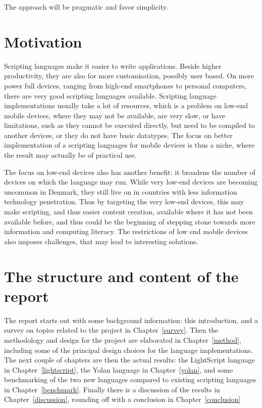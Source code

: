 \documentclass[11pt]{report}
\begin{document}
    The approach will be pragmatic and favor simplicity.

\section{Motivation}

Scripting languages make it easier to write applications\cite{scripting-ousterhout}. Beside higher productivity, they are also for more customisation, possibly user based.
On more power full devices, ranging from high-end smartphones to personal computers, there are very good scripting languages available.
Scripting language implementations usually take a lot of resources, which is a problem on low-end mobile devices, where they may not be available, are very slow, or have limitations, such as they cannot be executed directly, but need to be compiled to another devices, or they do not have basic datatypes.
The focus on better implementation of a scripting languages for mobile devices is thus a niche, where the result may actually be of practical use.

The focus on low-end devices also has another benefit:
it broadens the number of devices on which the language may run.
While very low-end devices are becoming uncommon in Denmark,
they still live on in countries with less information technology penetration.
Thus by targeting the very low-end devices, 
this may make scripting, and thus easier content creation,
available where it has not been available before,
and thus could be the beginning of stepping stone 
towards more information and computing literacy.
The restrictions of low end mobile devices also imposes challenges, that may lead to interesting solutions.

\begin{comment}
From a personal point of view, 
I would like to get started on development for mobile devices, 
and would also like to brush up on programming language implementation.
Design and implementation of a scripting language for mobile devices is spot on this topic.
\end{comment}


\section{The structure and content of the report}

The report starts out with some background information: this introduction, and a survey on topics related to the project in Chapter~\ref{survey}.
Then the methodology and design for the project are elaborated in Chapter~\ref{method}, including some of the principal design choices for the language implementations.
The next couple of chapters are then the actual results: the LightScript language in Chapter~\ref{lightscript}, the Yolan language in Chapter~\ref{yolan}, and some benchmarking of the two new languages compared to existing scripting languages in Chapter~\ref{benchmark}.
Finally there is a discussion of the results in Chapter~\ref{discussion}, rounding off with a conclusion in Chapter~\ref{conclusion}
\end{document}

